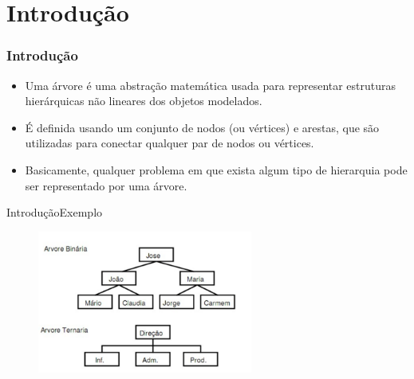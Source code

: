 \documentclass[aspectratio=169]{beamer}
\begin{document}
% 
%     
%     
%   
\section{Introdução} %

\begin{frame}
\frametitle{Introdução}
\begin{itemize}
 \item Uma árvore é uma abstração matemática usada para representar estruturas hierárquicas não lineares dos objetos modelados.
 \item É definida usando um conjunto de nodos (ou vértices) e arestas, que são utilizadas para conectar qualquer par de nodos ou vértices.
 \item Basicamente, qualquer problema em que exista algum tipo de hierarquia pode ser representado por uma árvore.
\end{itemize}
\end{frame}

\begin{frame}{Introdução}{Exemplo}
\begin{figure}[!h]
  \centering
   \includegraphics[width=200pt]{imagens/exemplo.png}
  \label{fig_exemplo}
\end{figure}
\end{frame}
\end{document}
